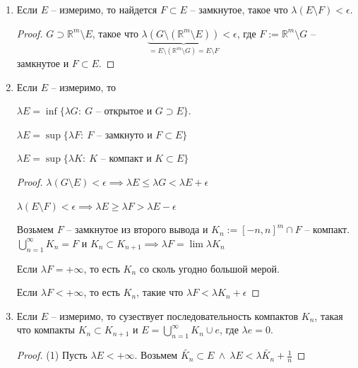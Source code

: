 \begin{consequence}
    \begin{enumerate}
        \item {
            Если $E$ -- измеримо, то найдется $F \subset E$ -- замкнутое, такое что $\lambda (E \setminus F) < \epsilon$.

            \begin{proof}
                $G \supset \mathbb{R}^m \setminus E$, такое что $\lambda \underbrace{(G \setminus (\mathbb{R}^m \setminus E))}_{= E \setminus (\mathbb{R}^m \setminus G) = E \setminus F} < \epsilon$, где $F := \mathbb{R}^m \setminus G$ -- замкнутое и $F \subset E$.
            \end{proof}
        }
        \item {
            Если $E$ -- измеримо, то
            
            $\lambda E = \inf \{ \lambda G : \ G \text{ -- открытое и } G \supset E \}$.

            $\lambda E = \sup \{ \lambda F : \ F \text{ -- замкнуто и } F \subset E \}$
            
            $\lambda E = \sup \{ \lambda K : \ K \text{ -- компакт и } K \subset E \}$
            
            \begin{proof}
                
                $\lambda (G \setminus E) < \epsilon \implies \lambda E \leq \lambda G < \lambda E + \epsilon$


                $\lambda (E \setminus F) < \epsilon \implies \lambda E \geq \lambda F > \lambda E - \epsilon$

                Возьмем $F$ -- замкнутое из второго вывода и $K_n := [-n, n]^m \cap F$ -- компакт. $\bigcup_{n=1}^{\infty} K_n = F$ и $K_n \subset K_{n+1} \implies \lambda F = \lim{\lambda K_n}$

                Если $\lambda F = +\infty$, то есть $K_n$ со сколь угодно большой мерой.

                Если $\lambda F < +\infty$, то есть $K_n$, такие что $\lambda F < \lambda K_n + \epsilon$
            \end{proof}
        }
        \item {
            Если $E$ -- измеримо, то сузествует последовательность компактов $K_n$, такая что компакты $K_n \subset K_{n+1}$ и $E = \bigcup_{n=1}^{\infty} K_n \cup e$, где $\lambda e = 0$.

            \begin{proof}
                (1) Пусть $\lambda E < +\infty$. Возьмем $\tilde{K_n} \subset E \ \land \ \lambda E < \lambda \tilde{K_n} + \frac{1}{n}$


\end{proof}}
\end{enumerate}
\end{consequence}
